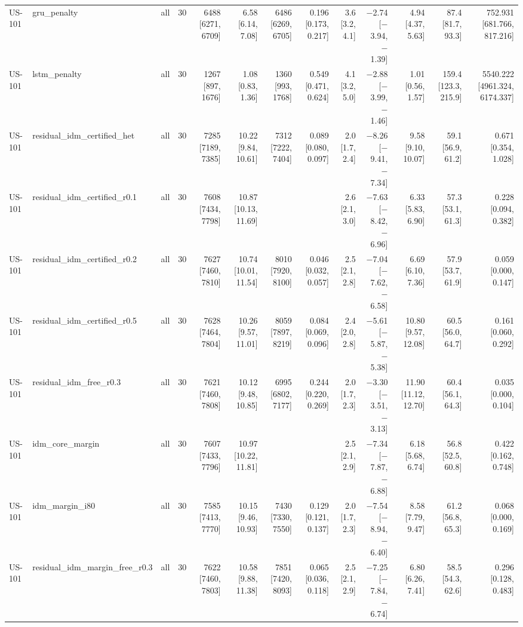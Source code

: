 \begin{table}[htbp]
{\begin{tabular}{lllrrrrrrrrrr}
US-101 & gru\_penalty & all & 30 & 6488 [6271, 6709] & 6.58 [6.14, 7.08] & 6486 [6269, 6705] & 0.196 [0.173, 0.217] & 3.6 [3.2, 4.1] & $-$2.74 [$-$3.94, $-$1.39] & 4.94 [4.37, 5.63] & 87.4 [81.7, 93.3] & 752.931 [681.766, 817.216] \\
US-101 & lstm\_penalty & all & 30 & 1267 [897, 1676] & 1.08 [0.83, 1.36] & 1360 [993, 1768] & 0.549 [0.471, 0.624] & 4.1 [3.2, 5.0] & $-$2.88 [$-$3.99, $-$1.46] & 1.01 [0.56, 1.57] & 159.4 [123.3, 215.9] & 5540.222 [4961.324, 6174.337] \\
US-101 & residual\_idm\_certified\_het & all & 30 & 7285 [7189, 7385] & 10.22 [9.84, 10.61] & 7312 [7222, 7404] & 0.089 [0.080, 0.097] & 2.0 [1.7, 2.4] & $-$8.26 [$-$9.41, $-$7.34] & 9.58 [9.10, 10.07] & 59.1 [56.9, 61.2] & 0.671 [0.354, 1.028] \\
US-101 & residual\_idm\_certified\_r0.1 & all & 30 & 7608 [7434, 7798] & 10.87 [10.13, 11.69] &  &  & 2.6 [2.1, 3.0] & $-$7.63 [$-$8.42, $-$6.96] & 6.33 [5.83, 6.90] & 57.3 [53.1, 61.3] & 0.228 [0.094, 0.382] \\
US-101 & residual\_idm\_certified\_r0.2 & all & 30 & 7627 [7460, 7810] & 10.74 [10.01, 11.54] & 8010 [7920, 8100] & 0.046 [0.032, 0.057] & 2.5 [2.1, 2.8] & $-$7.04 [$-$7.62, $-$6.58] & 6.69 [6.10, 7.36] & 57.9 [53.7, 61.9] & 0.059 [0.000, 0.147] \\
US-101 & residual\_idm\_certified\_r0.5 & all & 30 & 7628 [7464, 7804] & 10.26 [9.57, 11.01] & 8059 [7897, 8219] & 0.084 [0.069, 0.096] & 2.4 [2.0, 2.8] & $-$5.61 [$-$5.87, $-$5.38] & 10.80 [9.57, 12.08] & 60.5 [56.0, 64.7] & 0.161 [0.060, 0.292] \\
US-101 & residual\_idm\_free\_r0.3 & all & 30 & 7621 [7460, 7808] & 10.12 [9.48, 10.85] & 6995 [6802, 7177] & 0.244 [0.220, 0.269] & 2.0 [1.7, 2.3] & $-$3.30 [$-$3.51, $-$3.13] & 11.90 [11.12, 12.70] & 60.4 [56.1, 64.3] & 0.035 [0.000, 0.104] \\
US-101 & idm\_core\_margin & all & 30 & 7607 [7433, 7796] & 10.97 [10.22, 11.81] &  &  & 2.5 [2.1, 2.9] & $-$7.34 [$-$7.87, $-$6.88] & 6.18 [5.68, 6.74] & 56.8 [52.5, 60.8] & 0.422 [0.162, 0.748] \\
US-101 & idm\_margin\_i80 & all & 30 & 7585 [7413, 7770] & 10.15 [9.46, 10.93] & 7430 [7330, 7550] & 0.129 [0.121, 0.137] & 2.0 [1.7, 2.3] & $-$7.54 [$-$8.94, $-$6.40] & 8.58 [7.79, 9.47] & 61.2 [56.8, 65.3] & 0.068 [0.000, 0.169] \\
US-101 & residual\_idm\_margin\_free\_r0.3 & all & 30 & 7622 [7460, 7803] & 10.58 [9.88, 11.38] & 7851 [7420, 8093] & 0.065 [0.036, 0.118] & 2.5 [2.1, 2.9] & $-$7.25 [$-$7.84, $-$6.74] & 6.80 [6.26, 7.41] & 58.5 [54.3, 62.6] & 0.296 [0.128, 0.483] \\

\end{tabular}}
\end{table}
